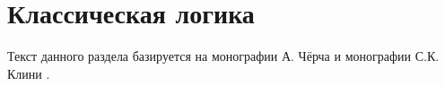 \chapter{Классическая логика}

Текст данного раздела базируется на монографии А. Чёрча \cite{Church} и монографии С.К. Клини \cite{Kleene}.
















